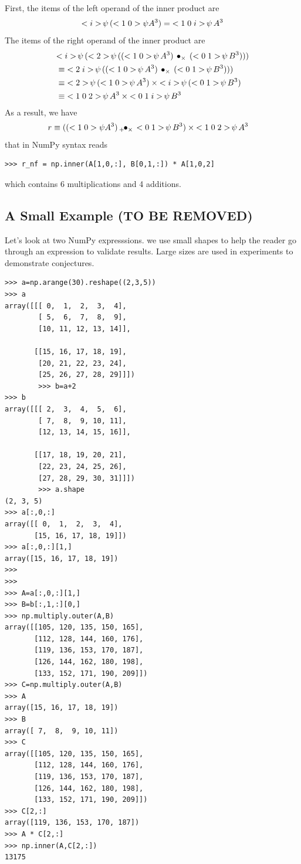 \documentclass[a4paper,12pt]{article}
\begin{document}
First, the items of the left operand of the inner product are
\begin{align*}
  \getitem{(\vcc10\psi A^3)}{\vc i} = \getitem{A^3}{\vccc10i}
\end{align*}
The items of the right operand of the inner product are
\begin{align}
&\getitem{
  (\getitem{((\getitem{A^3}{\vcc10}) \outerprod\times (\getitem{B^3}{\vcc01}))}{\vc2})
}{\vc i} \\
&\equiv \getitem{((\getitem{A^3}{\vcc10}) \outerprod\times (\getitem{B^3}{\vcc01})))}{\vcc2i} \\
&\equiv \getitem{(\getitem{A^3}{\vcc10})}{\vc2} \times \getitem{(\getitem{B^3}{\vcc01})}{\vc i}\\
&\equiv \getitem{A^3}{\vccc102} \times \getitem{B^3}{\vccc01i}
\end{align}
As a result, we have
\begin{align*}
  r &\equiv ((\vcc10\psi A^3) \innerprod+\times  \getitem{B^3}{\vcc01})\times\getitem{A^3}{\vccc102}
\end{align*}
that in NumPy syntax reads
\begin{verbatim}
>>> r_nf = np.inner(A[1,0,:], B[0,1,:]) * A[1,0,2]
\end{verbatim}
which contains 6 multiplications and 4 additions.

\subsection{A Small Example (TO BE REMOVED)}
Let's look at two NumPy expresssions. we  use small shapes to help the reader go through an expression to validate results. Large sizes are used in experiments to demonstrate conjectures. 
\begin{verbatim}   
>>> a=np.arange(30).reshape((2,3,5))
>>> a
array([[[ 0,  1,  2,  3,  4],
        [ 5,  6,  7,  8,  9],
        [10, 11, 12, 13, 14]],

       [[15, 16, 17, 18, 19],
        [20, 21, 22, 23, 24],
        [25, 26, 27, 28, 29]]])
        >>> b=a+2
>>> b
array([[[ 2,  3,  4,  5,  6],
        [ 7,  8,  9, 10, 11],
        [12, 13, 14, 15, 16]],

       [[17, 18, 19, 20, 21],
        [22, 23, 24, 25, 26],
        [27, 28, 29, 30, 31]]])
        >>> a.shape
(2, 3, 5)
>>> a[:,0,:]
array([[ 0,  1,  2,  3,  4],
       [15, 16, 17, 18, 19]])
>>> a[:,0,:][1,]
array([15, 16, 17, 18, 19])
>>> 
>>> 
>>> A=a[:,0,:][1,]
>>> B=b[:,1,:][0,]
>>> np.multiply.outer(A,B)
array([[105, 120, 135, 150, 165],
       [112, 128, 144, 160, 176],
       [119, 136, 153, 170, 187],
       [126, 144, 162, 180, 198],
       [133, 152, 171, 190, 209]])
>>> C=np.multiply.outer(A,B)
>>> A
array([15, 16, 17, 18, 19])
>>> B
array([ 7,  8,  9, 10, 11])
>>> C
array([[105, 120, 135, 150, 165],
       [112, 128, 144, 160, 176],
       [119, 136, 153, 170, 187],
       [126, 144, 162, 180, 198],
       [133, 152, 171, 190, 209]])
>>> C[2,:]
array([119, 136, 153, 170, 187])
>>> A * C[2,:]
>>> np.inner(A,C[2,:])
13175
\end{verbatim}
     
\end{document}
